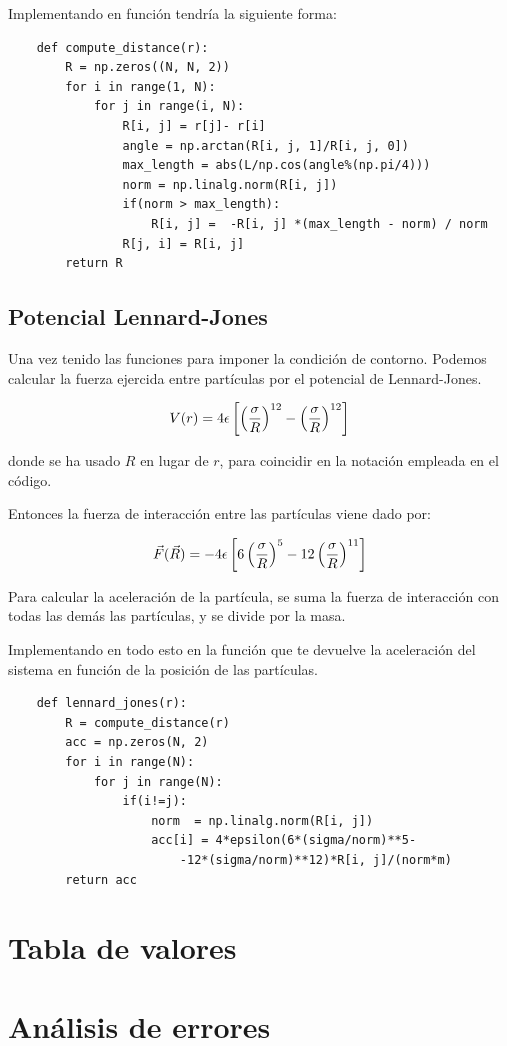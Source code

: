 \documentclass[11pt, twoside]{article} %
\begin{document}
Implementando en función tendría la siguiente forma:

\begin{verbatim}
    def compute_distance(r):
        R = np.zeros((N, N, 2))
        for i in range(1, N):
            for j in range(i, N):
                R[i, j] = r[j]- r[i]
                angle = np.arctan(R[i, j, 1]/R[i, j, 0])
                max_length = abs(L/np.cos(angle%(np.pi/4)))
                norm = np.linalg.norm(R[i, j])
                if(norm > max_length):
                    R[i, j] =  -R[i, j] *(max_length - norm) / norm
                R[j, i] = R[i, j]
        return R
\end{verbatim}

\subsection{Potencial Lennard-Jones}

Una vez tenido las funciones para imponer la condición de contorno. Podemos
calcular la fuerza ejercida entre partículas por el potencial de Lennard-Jones.

\begin{equation}
    V(r) = 4\epsilon\left[\left(\frac{\sigma}{R}\right)^{12}-
        \left(\frac{\sigma}{R}\right)^{12}\right]
    \label{eq:Lennard_Jones_potential}
\end{equation}

donde se ha usado $R$ en lugar de $r$, para coincidir en la notación empleada en 
el código.

\vspace{3mm}

Entonces la fuerza de interacción entre las partículas viene dado por:

\begin{equation}
    \vec{F}(\vec{R}) =  - 4\epsilon\left[6\left(\frac{\sigma}{R}\right)^{5}-
    12\left(\frac{\sigma}{R}\right)^{11}\right]
\end{equation}

Para calcular la aceleración de la partícula, se suma la fuerza de interacción con
todas las demás las partículas, y se divide por la masa.

Implementando en todo esto en la función que te devuelve la aceleración del sistema
en función de la posición de las partículas.

\begin{verbatim}
    def lennard_jones(r):
        R = compute_distance(r)
        acc = np.zeros(N, 2)
        for i in range(N):
            for j in range(N):
                if(i!=j):
                    norm  = np.linalg.norm(R[i, j])
                    acc[i] = 4*epsilon(6*(sigma/norm)**5-
                        -12*(sigma/norm)**12)*R[i, j]/(norm*m)
        return acc
\end{verbatim}




\newpage

\appendix

\section{Tabla de valores}


\newpage

\section{Análisis de errores}
\end{document}
